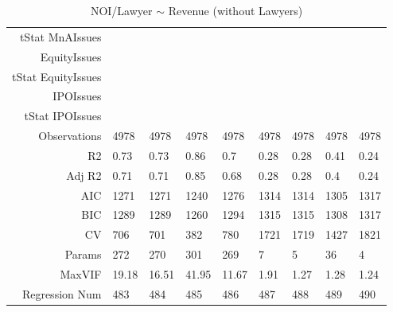 \begin{table}[ht]
\begin{tabular}{rllllllll}
  tStat MnAIssues &  &  &  &  &  &  &  &  \\ 
  EquityIssues &  &  &  &  &  &  &  &  \\ 
  tStat EquityIssues &  &  &  &  &  &  &  &  \\ 
  IPOIssues &  &  &  &  &  &  &  &  \\ 
  tStat IPOIssues &  &  &  &  &  &  &  &  \\ 
  Observations & 4978 & 4978 & 4978 & 4978 & 4978 & 4978 & 4978 & 4978 \\ 
  R2 & 0.73 & 0.73 & 0.86 & 0.7 & 0.28 & 0.28 & 0.41 & 0.24 \\ 
  Adj R2 & 0.71 & 0.71 & 0.85 & 0.68 & 0.28 & 0.28 & 0.4 & 0.24 \\ 
  AIC & 1271 & 1271 & 1240 & 1276 & 1314 & 1314 & 1305 & 1317 \\ 
  BIC & 1289 & 1289 & 1260 & 1294 & 1315 & 1315 & 1308 & 1317 \\ 
  CV & 706 & 701 & 382 & 780 & 1721 & 1719 & 1427 & 1821 \\ 
  Params & 272 & 270 & 301 & 269 & 7 & 5 & 36 & 4 \\ 
  MaxVIF & 19.18 & 16.51 & 41.95 & 11.67 & 1.91 & 1.27 & 1.28 & 1.24 \\ 
  Regression Num & 483 & 484 & 485 & 486 & 487 & 488 & 489 & 490 \\ 
   \hline
\end{tabular}
\caption{NOI/Lawyer $\sim$ Revenue (without Lawyers)} 
\end{table}
